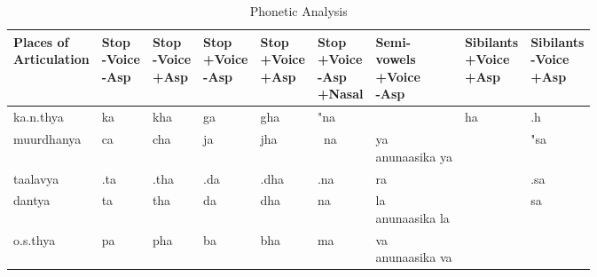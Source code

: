 \documentclass[a4paper, 12pt]{article}
\newcommand \sans[1]{
    \textsanskrit{#1}
}
\begin{document}
\begin{table}[htbp!]
\begin{center}
    \caption{Phonetic Analysis}
    \label{tab: phonetic}
\begin{tabular}{|l|l|l|l|l|l|l|l|l|}
\hline
    \thead
    {
        Places of\\Articulation
    } &
    \thead{Stop\\-Voice\\-Asp} &
    \thead{Stop\\-Voice\\+Asp} &
    \thead{Stop\\+Voice\\-Asp} &
    \thead{Stop\\+Voice\\+Asp} &
    \thead{Stop\\+Voice\\-Asp\\+Nasal} &
    \thead{Semi-\\vowels\\+Voice\\-Asp} &
    \thead{Sibilants\\+Voice\\+Asp} &
    \thead{Sibilants\\-Voice\\+Asp} \\
    \hline
    \sans{ka.n.thya} &
    \sans{ka} &
    \sans{kha} &
    \sans{ga} &
    \sans{gha} &
    \sans{"na} &
    \sans{} &
    \sans{ha} &
    \sans{.h}  \\
    \hline
    \sans{muurdhanya} &
    \sans{ca} &
    \sans{cha} &
    \sans{ja} &
    \sans{jha} &
    \sans{~na} &
    \makecell{\sans{ya}\\ \sans{anunaasika ya}} &
    \sans{} &
    \sans{"sa}  \\
    \hline
    \sans{taalavya} &
    \sans{.ta} &
    \sans{.tha} &
    \sans{.da} &
    \sans{.dha} &
    \sans{.na} &
    \sans{ra} &
    \sans{} &
    \sans{.sa}  \\
    \hline
    \sans{dantya} &
    \sans{ta} &
    \sans{tha} &
    \sans{da} &
    \sans{dha} &
    \sans{na} &
    \makecell{\sans{la}\\ \sans{anunaasika la}} &
    \sans{} &
    \sans{sa}  \\
    \hline
    \sans{o.s.thya} &
    \sans{pa} &
    \sans{pha} &
    \sans{ba} &
    \sans{bha} &
    \sans{ma} &
    \makecell{\sans{va}\\ \sans{anunaasika va}} &
    \sans{} &
    \sans{}  \\
    \hline
\end{tabular}
\end{center}
\end{table}
\end{document}
